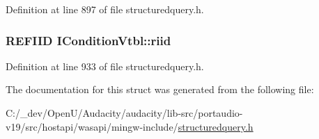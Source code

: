 Definition at line 897 of file structuredquery.\+h.

\subsubsection[{\texorpdfstring{riid}{riid}}]{ {\bf R\+E\+F\+I\+ID} I\+Condition\+Vtbl\+::riid}\hypertarget{struct_i_condition_vtbl_a4017cd80e29e3931243189463d80549e}{}\label{struct_i_condition_vtbl_a4017cd80e29e3931243189463d80549e}


Definition at line 933 of file structuredquery.\+h.



The documentation for this struct was generated from the following file\+:\begin{DoxyCompactItemize}
\item 
C\+:/\+\_\+dev/\+Open\+U/\+Audacity/audacity/lib-\/src/portaudio-\/v19/src/hostapi/wasapi/mingw-\/include/\hyperlink{structuredquery_8h}{structuredquery.\+h}\end{DoxyCompactItemize}
